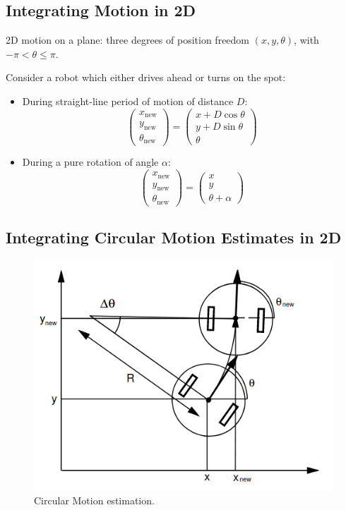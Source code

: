 \documentclass[11pt]{article}
\begin{document}
\subsection{Integrating Motion in 2D}
2D motion on a plane: three degrees of position freedom $(x, y, \theta)$, with $-\pi < \theta \leq \pi$.

Consider a robot which either drives ahead or turns on the spot:
\begin{itemize}
  \item During straight-line period of motion of distance $D$:
    \[
      \begin{pmatrix}
        x_{\text{new}} \\
        y_{\text{new}} \\
        \theta_{\text{new}} 
      \end{pmatrix}
      =
      \begin{pmatrix}
        x + D\cos\theta \\
        y + D\sin\theta \\
        \theta 
      \end{pmatrix}
    \]
  \item During a pure rotation of angle $\alpha$:
    \[
      \begin{pmatrix}
        x_{\text{new}} \\
        y_{\text{new}} \\
        \theta_{\text{new}} 
      \end{pmatrix}
      =
      \begin{pmatrix}
        x \\
        y \\
        \theta + \alpha
      \end{pmatrix}
    \]
\end{itemize}

\subsection{Integrating Circular Motion Estimates in 2D}
\begin{figure}[h]
  \caption{Circular Motion estimation.}
  \includegraphics[scale=0.4]{circularmotionestimate}
  \centering
\end{figure}
\end{document}
